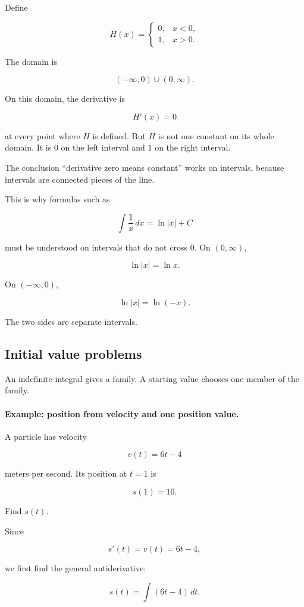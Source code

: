 Define

\[
H(x)=
\begin{cases}
0, & x<0,\\
1, & x>0.
\end{cases}
\]

The domain is

\[
(-\infty,0)\cup(0,\infty).
\]

On this domain, the derivative is

\[
H'(x)=0
\]

at every point where \(H\) is defined.  But \(H\) is not one constant on its whole domain.
It is \(0\) on the left interval and \(1\) on the right interval.

The conclusion ``derivative zero means constant'' works on intervals, because intervals
are connected pieces of the line.

This is why formulas such as

\[
\int \frac1x\,dx=\ln|x|+C
\]

must be understood on intervals that do not cross \(0\).  On \((0,\infty)\),

\[
\ln|x|=\ln x.
\]

On \((-\infty,0)\),

\[
\ln|x|=\ln(-x).
\]

The two sides are separate intervals.

\subsection{Initial value problems}
\label{subsec:initial-value-problems-antiderivatives}

An indefinite integral gives a family.  A starting value chooses one member of the
family.

\paragraph{Example: position from velocity and one position value.}
A particle has velocity

\[
v(t)=6t-4
\]

meters per second.  Its position at \(t=1\) is

\[
s(1)=10.
\]

Find \(s(t)\).

Since

\[
s'(t)=v(t)=6t-4,
\]

we first find the general antiderivative:

\[
s(t)=\int (6t-4)\,dt.
\]

